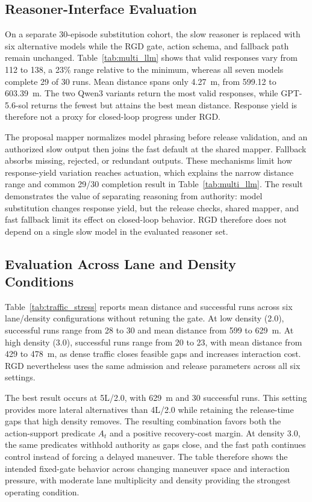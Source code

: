 \documentclass[letterpaper,journal]{IEEEtran}
\begin{document}
\subsection{Reasoner-Interface Evaluation}
On a separate 30-episode substitution cohort, the slow reasoner is replaced
with six alternative models while the RGD gate, action schema, and fallback
path remain unchanged. Table~\ref{tab:multi_llm} shows that valid responses
vary from 112 to 138, a 23\% range relative to the minimum, whereas all seven
models complete 29 of 30 runs. Mean distance spans only 4.27~m, from 599.12 to
603.39~m. The two Qwen3 variants return the most valid responses, while
GPT-5.6-sol returns the fewest but attains the best mean distance. Response
yield is therefore not a proxy for closed-loop progress under RGD.

The proposal mapper normalizes model phrasing before release validation, and an
authorized slow output then joins the fast default at the shared mapper.
Fallback absorbs missing, rejected, or redundant outputs. These mechanisms limit how
response-yield variation reaches actuation, which explains
the narrow distance range and common 29/30 completion result in
Table~\ref{tab:multi_llm}. The result demonstrates the value of separating
reasoning from authority: model substitution changes response yield, but the
release checks, shared mapper, and fast fallback limit its effect on closed-loop
behavior. RGD therefore does not depend on a single slow model in the evaluated
reasoner set.
\subsection{Evaluation Across Lane and Density Conditions}
\label{subsec:traffic}
Table~\ref{tab:traffic_stress} reports mean distance and successful runs
across six lane/density configurations without retuning the gate. At low
density (2.0), successful runs range from 28 to 30 and mean distance from
599 to 629~m. At high density (3.0), successful runs range from 20 to 23,
with mean distance from 429 to 478~m, as dense traffic closes feasible gaps and increases
interaction cost. RGD nevertheless uses the same admission and release
parameters across all six settings.

The best result occurs at 5L/2.0, with 629~m and 30 successful runs. This
setting provides more lateral alternatives than 4L/2.0 while retaining the
release-time gaps that high density removes. The resulting combination favors
both the action-support predicate $A_t$ and a positive recovery-cost margin.
At density 3.0, the same predicates withhold authority as gaps close, and the
fast path continues control instead of forcing a delayed maneuver. The table
therefore shows the intended fixed-gate behavior across changing maneuver
space and interaction pressure, with moderate lane multiplicity and density
providing the strongest operating condition.
\end{document}
